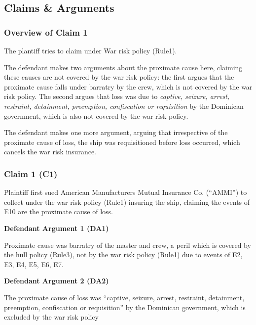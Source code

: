 
\subsection{Claims \& Arguments}

    \subsubsection{Overview of Claim 1}
    
    The plantiff tries to claim under War risk policy (Rule1).
    
    The defendant makes two arguments about the proximate cause here, claiming these causes are not covered by the war risk policy: the first argues that the proximate cause falls under barratry by the crew, which is not covered by the war risk policy. The second argues that loss was due to \textit{captive, seizure, arrest, restraint, detainment, preemption, confiscation or requisition} by the Dominican government, which is also not covered by the war risk policy.
    
    The defendant makes one more argument, arguing that irrespective of the proximate cause of loss, the ship was requisitioned before loss occurred, which cancels the war risk insurance.
            
    
    \subsubsection{Claim 1 (C1)}
    
        Plaintiff first sued American Manufacturers Mutual Insurance Co. (“AMMI”) to collect under the war risk policy (Rule1) insuring the ship, claiming the events of E10 are the proximate cause of loss.
        
        \textbf{Defendant Argument 1 (DA1)}
        
            Proximate cause was barratry of the master and crew, a peril which is covered by the hull policy (Rule3), not by the war risk policy (Rule1) due to events of E2, E3, E4, E5, E6, E7.
            
        
        \textbf{Defendant Argument 2 (DA2)}
        
            The proximate cause of loss was “captive, seizure, arrest, restraint, detainment, preemption, confiscation or requisition” by the Dominican government, which is excluded by the war risk policy
            
